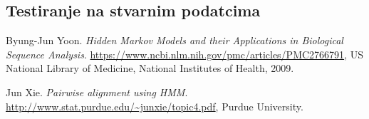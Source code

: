 \documentclass[a4paper]{article}
\begin{document}
\subsection{Testiranje na stvarnim podatcima}

\newpage
\begin{thebibliography}{9}
Byung-Jun Yoon. 
\textit{Hidden Markov Models and their Applications in Biological Sequence Analysis}.
\url{https://www.ncbi.nlm.nih.gov/pmc/articles/PMC2766791}, 
 US National Library of Medicine, National Institutes of Health, 2009.


Jun Xie. 
\textit{Pairwise alignment using HMM}.
\url{http://www.stat.purdue.edu/~junxie/topic4.pdf},
 Purdue University.


\end{thebibliography}
\end{document}
